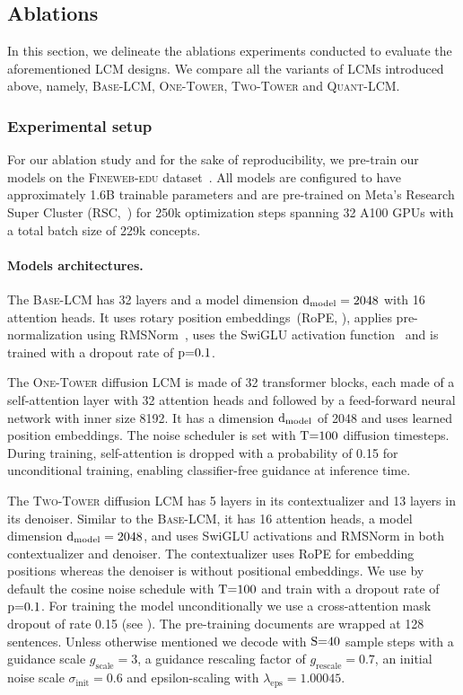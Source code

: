 \documentclass[twoside,11pt]{fairmeta}
\newcommand{\lcm}{\textsc{LCM}\xspace}
\newcommand{\lcms}{\textsc{LCMs}\xspace}
\newcommand{\twotower}{\textsc{Two-Tower}\xspace}
\newcommand{\interleaved}{\textsc{One-Tower}\xspace}
\newcommand{\mselcm}{\textsc{Base-LCM}\xspace}
\newcommand{\qlcm}{\textsc{Quant-LCM}\xspace}
\newcommand{\sigmainit}{\sigma_\text{init}}
\newcommand{\modeldim}{\rd_\text{model}}
\newcommand{\guidance}{g_\text{scale}}
\newcommand{\rsguidance}{g_\text{rescale}}
\newcommand{\epscaling}{\lambda_\text{eps}}
\newcommand{\ctxenc}{contextualizer\xspace}
\newcommand{\denoiser}{denoiser\xspace}
\newcommand{\fineweb}{\textsc{Fineweb-edu}\xspace}
\def\rd{{\textnormal{d}}}
\def\rp{{\textnormal{p}}}
\def\rS{{\textnormal{S}}}
\def\rT{{\textnormal{T}}}
\begin{document}
\subsection{Ablations}
\label{sec:archi:lcm:ablations}
In this section, we delineate the ablations experiments conducted to evaluate the aforementioned \lcm designs.
We compare all the variants of \lcms introduced above, namely, \mselcm, \interleaved, \twotower and \qlcm.

\subsubsection{Experimental setup}\label{sec:archi:lcm:ablation:setup}


For our ablation study and for the sake of reproducibility, we pre-train our models on the \fineweb dataset~\citep{fineweb-edu}.
All models are configured to have approximately 1.6B trainable parameters and are pre-trained on Meta’s Research Super Cluster (RSC,~\citet{rsc}) for 250k optimization steps spanning 32 A100 GPUs with a total batch size of 229k concepts.


\paragraph{Models architectures.}
The \mselcm has 32 layers and a model dimension $\modeldim=2048$ with 16 attention heads. It uses rotary position embeddings~(RoPE, \citet{su2024roformer}), applies pre-normalization using RMSNorm~\citep{zhang2019root}, uses the SwiGLU activation function~\citep{shazeer2020glu} and is trained with a dropout rate of $\rp{=}0.1$.

The \interleaved diffusion \lcm is made of 32 transformer blocks, 
each made of a self-attention layer with 32 attention heads and followed by a feed-forward neural network with inner size 8192. 
It has a dimension $\modeldim$ of 2048 and uses learned position embeddings.
The noise scheduler is set with $\rT{=}100$ diffusion timesteps.
During training, self-attention is dropped with a probability of 0.15 for unconditional training, enabling classifier-free guidance at inference time.

The \twotower diffusion \lcm has 5 layers in its \ctxenc and 13 layers in its \denoiser.
Similar to the \mselcm, it has 16 attention heads, a model dimension $\modeldim=2048$, and uses SwiGLU activations and RMSNorm in both \ctxenc and \denoiser. The \ctxenc uses RoPE for embedding positions whereas the \denoiser is without positional embeddings. We use by default the cosine noise schedule with $\rT{=}100$ and train with a dropout rate of $\rp{=}0.1$. For training the model unconditionally we use a cross-attention mask dropout of rate 0.15 (see ). The pre-training documents are wrapped at 128 sentences.
Unless otherwise mentioned we decode with $\rS{=}40$ sample steps with a guidance scale $\guidance=3$, a guidance rescaling factor of $\rsguidance=0.7$, an initial noise scale $\sigmainit=0.6$ and epsilon-scaling with $\epscaling=1.00045$.
\end{document}
